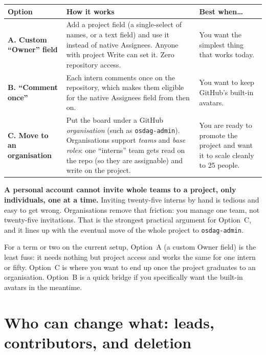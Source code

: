 \documentclass[11pt,a4paper]{report}
\newcommand{\code}[1]{\texttt{#1}}
\begin{document}
\begin{center}
\begin{longtable}{@{}p{3.4cm}p{6.2cm}p{3.4cm}@{}}
\toprule
\textbf{Option} & \textbf{How it works} & \textbf{Best when\ldots} \\
\midrule
\endhead
\textbf{A. Custom ``Owner'' field} & Add a project field (a single-select of names, or a text field) and use it instead of native Assignees. Anyone with project Write can set it. Zero repository access. & You want the simplest thing that works today. \\
\addlinespace
\textbf{B. ``Comment once''} & Each intern comments once on the repository, which makes them eligible for the native Assignees field from then on. & You want to keep GitHub's built-in avatars. \\
\addlinespace
\textbf{C. Move to an organisation} & Put the board under a GitHub \emph{organisation} (such as \code{osdag-admin}). Organisations support \emph{teams} and \emph{base roles}: one ``interns'' team gets read on the repo (so they are assignable) and write on the project. & You are ready to promote the project and want it to scale cleanly to 25 people. \\
\bottomrule
\end{longtable}
\end{center}

\begin{gotcha}
\textbf{A personal account cannot invite whole teams to a project, only individuals,
one at a time.} Inviting twenty-five interns by hand is tedious and easy to get
wrong. Organisations remove that friction: you manage one team, not twenty-five
invitations. That is the strongest practical argument for Option~C, and it lines up
with the eventual move of the whole project to \code{osdag-admin}.
\end{gotcha}

\begin{plainenglish}
For a term or two on the current setup, Option~A (a custom Owner field) is the least
fuss: it needs nothing but project access and works the same for one intern or fifty.
Option~C is where you want to end up once the project graduates to an organisation.
Option~B is a quick bridge if you specifically want the built-in avatars in the
meantime.
\end{plainenglish}

\chapter{Who can change what: leads, contributors, and deletion}
\end{document}
